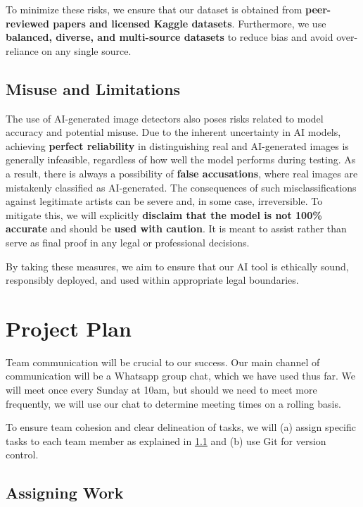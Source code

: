 \documentclass{article} %
\begin{document}
To minimize these risks, we ensure that our dataset is obtained from \textbf{peer-reviewed papers and licensed Kaggle datasets}. Furthermore, we use \textbf{balanced, diverse, and multi-source datasets} to reduce bias and avoid over-reliance on any single source.

\subsection{Misuse and Limitations}
The use of AI-generated image detectors also poses risks related to model accuracy and potential misuse. Due to the inherent uncertainty in AI models, achieving \textbf{perfect reliability} in distinguishing real and AI-generated images is generally infeasible, regardless of how well the model performs during testing. As a result, there is always a possibility of \textbf{false accusations}, where real images are mistakenly classified as AI-generated. The consequences of such misclassifications against legitimate artists can be severe and, in some case, irreversible. To mitigate this, we will explicitly \textbf{disclaim that the model is not 100\% accurate} and should be \textbf{used with caution}. It is meant to assist rather than serve as final proof in any legal or professional decisions.

By taking these measures, we aim to ensure that our AI tool is ethically sound, responsibly deployed, and used within appropriate legal boundaries.


\section{Project Plan}
\label{plan}

Team communication will be crucial to our success. Our main channel of communication will be a Whatsapp group chat, which we have used thus far. We will meet once every Sunday at 10am, but should we need to meet more frequently, we will use our chat to determine meeting times on a rolling basis.

To ensure team cohesion and clear delineation of tasks, we will (a) assign specific tasks to each team member as explained in \ref{assigning_work} and (b) use Git for version control.

\subsection{Assigning Work}
\label{assigning_work}
\end{document}

